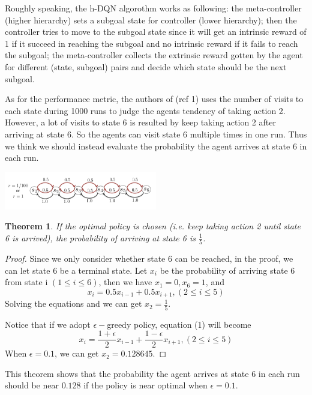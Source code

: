 \documentclass{article}
\newtheorem{theorem}{Theorem}
\begin{document}
\begin{spacing}{1.1}
    Roughly speaking, the h-DQN algorothm works as following: the meta-controller (higher hierarchy) sets a subgoal state for controller (lower hierarchy); then the controller tries to move to the subgoal state since it will get an intrinsic reward of 1 if it succeed in reaching the subgoal and no intrinsic reward if it fails to reach the subgoal; the meta-controller collects the extrinsic reward gotten by the agent for different (state, subgoal) pairs and decide which state should be the next subgoal.

    As for the performance metric, the authors of (ref 1) uses the number of visits to each state during 1000 runs to judge the agents tendency of taking action 2. However, a lot of visits to state 6 is resulted by keep taking action 2 after arriving at state 6. So the agents can visit state 6 multiple times in one run. Thus we think we should instead evaluate the probability the agent arrives at state 6 in each run.
    \begin{center}
        \includegraphics[width = 0.5\textwidth]{game.png}
    \end{center}
    \begin{theorem}
    If the optimal policy is chosen (i.e. keep taking action 2 until state 6 is arrived), the probability of arriving at state 6 is $\frac{1}{5}$. 
    \end{theorem}
    \begin{proof}
        Since we only consider whether state 6 can be reached, in the proof, we can let state 6 be a terminal state. Let $x_i$ be the probability of arriving state 6 from state i $(1\leq i \leq 6)$, then we have $x_1 = 0, x_6 = 1$, and
        \begin{equation}
            x_i = 0.5x_{i-1} + 0.5x_{i+1}, (2\leq i \leq 5)
        \end{equation}
        Solving the equations and we can get $x_2 = \frac{1}{5}$.

        Notice that if we adopt $\epsilon -$greedy policy, equation (1) will become
        \begin{equation}
            x_i = \frac{1 + \epsilon}{2}x_{i-1} + \frac{1 - \epsilon}{2}x_{i+1}, (2\leq i \leq 5)
        \end{equation}
        When $\epsilon = 0.1$, we can get $x_2 = 0.128645$.
    \end{proof}
    This theorem shows that the probability the agent arrives at state 6 in each run should be near $0.128$ if the policy is near optimal when $\epsilon = 0.1$.


\end{spacing}
\end{document}
